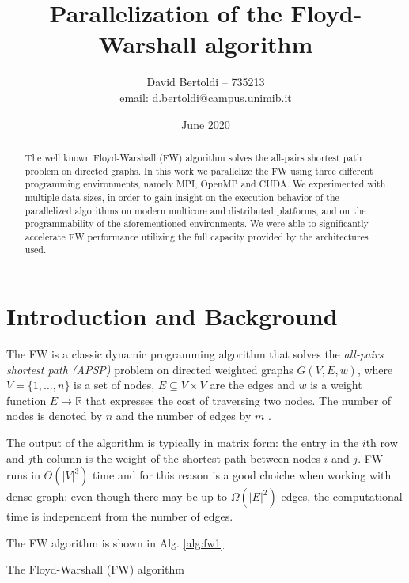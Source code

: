 \documentclass[compsoc]{IEEEtran}
\title{Parallelization of the Floyd-Warshall algorithm}
\author{David Bertoldi -- 735213 \\ email: d.bertoldi@campus.unimib.it}
\affil{Department of Informatics, Systems and Communication}
\affil{University of Milano-Bicocca}
\date{June 2020}
\begin{document}
\maketitle 
\begin{abstract}
The well known Floyd-Warshall (FW) algorithm solves the all-pairs shortest path problem on directed graphs. In this work we parallelize the FW using three different
programming environments, namely MPI, OpenMP and CUDA. We experimented with multiple data sizes, in order to gain insight on the execution behavior
of the parallelized algorithms on modern multicore and distributed platforms, and on the programmability of the aforementioned environments. We were able
to significantly accelerate FW performance utilizing the full capacity provided by the architectures used.
\end{abstract}
\section{Introduction and Background}
The FW is a classic dynamic programming algorithm that solves the \emph{all-pairs shortest path (APSP)} problem on directed weighted
graphs $G(V, E, w)$, where $V = \{1, \dots, n\}$ is a set of nodes, $E \subseteq V \times V$ are the edges and $w$ is a weight function $E \rightarrow  \mathbb{R}$
that expresses the cost of traversing two nodes. The number of nodes is denoted by $n$ and the number of edges by $m$ . \par
The output of the algorithm is typically in matrix form: the entry in the $i$th row and $j$th column is the weight of the shortest path between
nodes $i$ and $j$. FW runs in $\Theta(|V|^3)$ time and for this reason is a good choiche when working with dense graph: even though there
may be up to $\Omega(|E|^2)$ edges, the computational time is independent from the number of edges. \par
The FW algorithm is shown in Alg. \ref{alg:fw1}

\begin{algorithm}[h!]
\label{alg:fw1}
\SetAlgoLined

 
 \caption[alg:fw1]{The Floyd-Warshall (FW) algorithm}
\end{algorithm}
\end{document}
